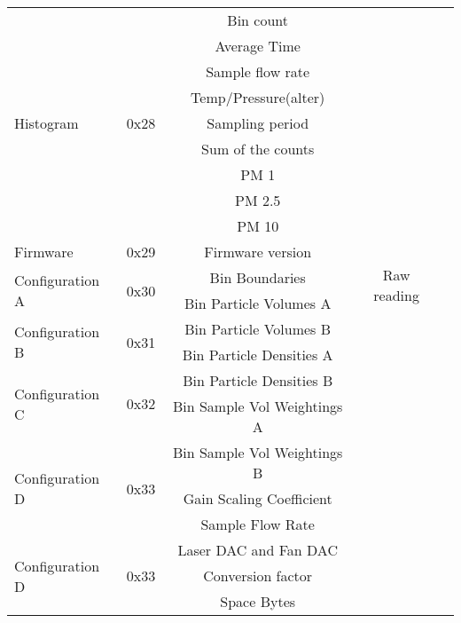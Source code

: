 \begin{landscape}
\begin{longtable}{l|c|c|c|c}
    \multirow{9}{*}{Histogram} & \multirow{9}{*}{0x28} & Bin count & \multirow{20}{*}{Raw reading} \\ \cline{3-3}
    & & Average Time & & \\ \cline{3-3}
    & & Sample flow rate & & \\ \cline{3-3}
    & & Temp/Pressure(alter) & & \\ \cline{3-3}
    & & Sampling period & & \\ \cline{3-3}
    & & Sum of the counts & & \\ \cline{3-3}
    & & PM 1 & & \\ \cline{3-3}
    & & PM 2.5 & & \\ \cline{3-3}
    & & PM 10 & & \\ \cline{1-3}
    Firmware & 0x29 & Firmware version & & \\ \cline{1-3}
    \multirow{2}{*}{Configuration A} & \multirow{2}{*}{0x30} & Bin Boundaries & & \\ \cline{3-3}
    & & Bin Particle Volumes A & & \\ \cline{1-3}
    \multirow{2}{*}{Configuration B} & \multirow{2}{*}{0x31} & Bin Particle Volumes B & & \\ \cline{3-3}
    & & Bin Particle Densities A & & \\ \cline{1-3}
    \multirow{2}{*}{Configuration C} & \multirow{2}{*}{0x32} & Bin Particle Densities B & & \\ \cline{3-3}
    & & Bin Sample Vol Weightings A & & \\ \cline{1-3}
    
    \multirow{3}{*}{Configuration D} & \multirow{3}{*}{0x33} & Bin Sample Vol Weightings B & & \\ \cline{3-3}
    & & Gain Scaling Coefficient & & \\ \cline{3-3}
    & & Sample Flow Rate & & \\ \hline

    \multirow{3}{*}{Configuration D} & \multirow{3}{*}{0x33} & Laser DAC and Fan DAC & & \\ \cline{3-3}
    & & Conversion factor & & \\ \cline{3-3}
    & & Space Bytes & & \\ 

    \end{longtable}
\end{landscape}

